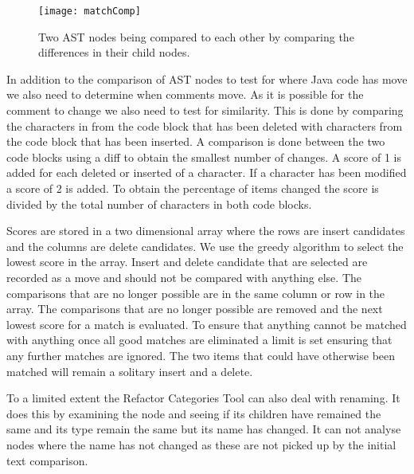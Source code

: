 \begin{figure}[!t]
 \begin{center}
 \texttt{[image: matchComp]}
 \end{center}
 \caption{Two AST nodes being compared to each other by comparing the differences in their child nodes.}
 \label{fig:matchComp}
\end{figure}

In addition to the comparison of AST nodes to test for where Java code has move we also need to determine when comments move.  As it is possible for the comment to change we also need to test for similarity.  This is done by comparing the characters in from the code block that has been deleted with characters from the code block that has been inserted.  A comparison is done between the two code blocks using a diff to obtain the smallest number of changes. A score of 1 is added for each deleted or inserted of a character.  If a character has been modified a score of 2 is added. To obtain the percentage of items changed the score is divided by the total number of characters in both code blocks.

Scores are stored in a two dimensional array where the rows are insert candidates and the columns are delete candidates.  We use the greedy algorithm to select the lowest score in the array.  Insert and delete candidate that are selected are recorded as a move and should not be compared with anything else. The comparisons that are no longer possible are in the same column or row in the array.  The comparisons that are no longer possible are removed and the next lowest score for a match is evaluated.  To ensure that anything cannot be matched with anything once all good matches are eliminated a limit is set ensuring that any further matches are ignored.  The two items that could have otherwise been matched will remain a solitary insert and a delete.

To a limited extent the Refactor Categories Tool can also deal with renaming. It does this by examining the node and seeing if its children have remained the same and its type remain the same but its name has changed. It can not analyse nodes where the name has not changed as these are not picked up by the initial text comparison.

